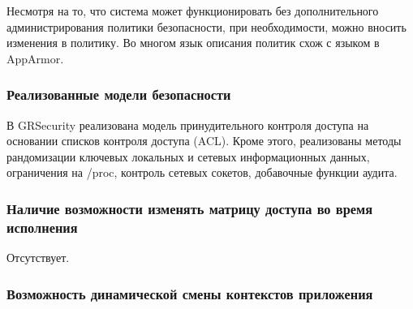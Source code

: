 \begin{comment}
Non-executable pages (NOEXEC) и mmap/mprotect 
(MPROTECT) предотвращают внедрение и исполнение 
кода с повышенными привилегиями. 
Address Layout Randomisation (ASLR) 
позволяет предотвратить все три упомянутые вида атак в той 
ситуации, когда атакующий заранее закладывается на 
адреса в атакуемом процессе и не может узнать о них 
в процессе исполнения. Так как PaX полностью внедрен 
в ядро, предполагается то, что ядро является Trusted 
Computer Base. Инструментарий позволяет предотвратить 
исполнение стека, обеспечить рандомизацию 
размещения адресов внутри адресного пространства 
(address space layout randomization) . 
Основная цель данного проекта — изучение различных защитных 
механизмов, защищающих от эксплойтов уязвимостей ПО, которые 
предоставляют злоумышленнику полные права на чтение/запись в 
системе. Исполнение кода связано с необходимостью изменять 
ход выполнения процесса используя уже существующий код. Одна 
из основных проблем — подмена адресов возврата из функций и 
подмена самих адресов функций. Для установки PaX требуется 
наложить патч на дерево исходных кодов ядра, после чего собрать 
ядро и установить в систему. 
\end{comment}

Несмотря на то, что система может функционировать 
без дополнительного администрирования политики 
безопасности, при необходимости, можно вносить 
изменения в политику. Во многом язык описания 
политик схож с языком в AppArmor. 

\subsubsection{Реализованные модели безопасности} 

В GRSecurity реализована модель принудительного контроля 
доступа на основании списков контроля доступа (ACL).
Кроме этого, реализованы методы рандомизации ключевых 
локальных и сетевых информационных данных, 
ограничения на /proc, контроль сетевых сокетов, 
добавочные функции аудита.   

\subsubsection{Наличие возможности изменять матрицу доступа во время 
	исполнения} 

Отсутствует.

\subsubsection{Возможность динамической смены контекстов приложения} 

